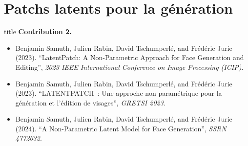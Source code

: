 \documentclass[aspectratio=169, 22pt]{beamer}
\begin{document}
\section{Patchs latents pour la génération}
\begin{frame}
  \vfill
  \begin{beamercolorbox}[sep=15pt,center,shadow=true,rounded=true]{title}
    \LARGE\bfseries Contribution 2.\\ \secname
  \end{beamercolorbox}
  \vfill
  \begin{itemize}
  \item \footnotesize Benjamin Samuth, Julien Rabin, David Tschumperlé, and
    Frédéric Jurie (2023). ``LatentPatch: A Non-Parametric Approach for
    Face Generation and Editing'', \emph{2023 IEEE International
      Conference on Image Processing (ICIP)}.
  \item \footnotesize Benjamin Samuth, Julien Rabin, David Tschumperlé, and
    Frédéric Jurie (2023). ``LATENTPATCH : Une approche non-paramétrique
    pour la génération et l’édition de visages'', \emph{GRETSI 2023}.
  \item \footnotesize Benjamin Samuth, Julien Rabin, David Tschumperlé, and Frédéric Jurie
    (2024). ``A Non-Parametric Latent Model for Face Generation'', \emph{SSRN 4772632}.
  \end{itemize}
\end{frame}
\end{document}
